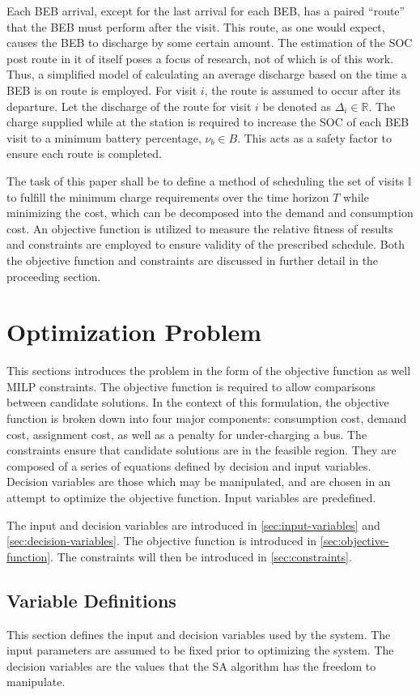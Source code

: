 \documentclass[11pt,a4paper,final]{article}
\newcommand{\I}{\mathbb{I}}                 %
\begin{document}
Each BEB arrival, except for the last arrival for each BEB, has a paired ``route'' that the BEB must perform after the
visit. This route, as one would expect, causes the BEB to discharge by some certain amount. The estimation of the SOC
post route in it of itself poses a focus of research, not of which is of this work. Thus, a simplified model of
calculating an average discharge based on the time a BEB is on route is employed. For visit \(i\), the route is assumed to
occur after its departure. Let the discharge of the route for visit \(i\) be denoted as \(\Delta_i \in \mathbb{R}\). The charge supplied
while at the station is required to increase the SOC of each BEB visit to a minimum battery percentage, \(\nu_b \in B\). This
acts as a safety factor to ensure each route is completed.

The task of this paper shall be to define a method of scheduling the set of visits \(\I\) to fulfill the minimum charge
requirements over the time horizon \(T\) while minimizing the cost, which can be decomposed into the demand and
consumption cost. An objective function is utilized to measure the relative fitness of results and constraints are
employed to ensure validity of the prescribed schedule. Both the objective function and constraints are discussed in
further detail in the proceeding section.
\section{Optimization Problem}
\label{sec:optimization-problem}
This sections introduces the problem in the form of the objective function as well MILP constraints. The objective
function is required to allow comparisons between candidate solutions. In the context of this formulation, the objective
function is broken down into four major components: consumption cost, demand cost, assignment cost, as well as a penalty
for under-charging a bus. The constraints ensure that candidate solutions are in the feasible region. They are composed
of a series of equations defined by decision and input variables. Decision variables are those which may be manipulated,
and are chosen in an attempt to optimize the objective function. Input variables are predefined.

The input and decision variables are introduced in \ref{sec:input-variables} and \ref{sec:decision-variables}. The
objective function is introduced in \ref{sec:objective-function}. The constraints will then be introduced in
\ref{sec:constraints}.

\subsection{Variable Definitions}
\label{sec:parameter-definitions}
This section defines the input and decision variables used by the system. The input parameters are assumed to be fixed
prior to optimizing the system. The decision variables are the values that the SA algorithm has the freedom to
manipulate.
\end{document}
